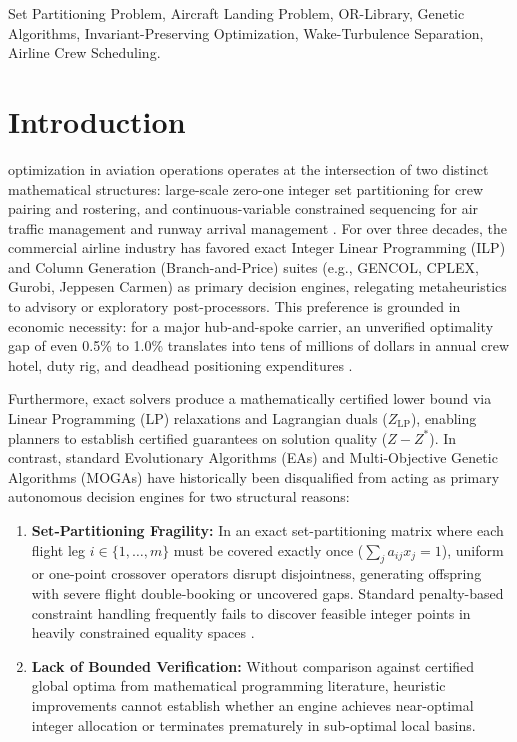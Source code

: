 \documentclass[10pt,journal,compsoc]{IEEEtran}
\begin{document}
{\begin{IEEEkeywords}
Set Partitioning Problem, Aircraft Landing Problem, OR-Library, Genetic Algorithms, Invariant-Preserving Optimization, Wake-Turbulence Separation, Airline Crew Scheduling.
\end{IEEEkeywords}}

\maketitle

\IEEEdisplaynontitleabstractindextext
\IEEEpeerreviewmaketitle

\section{Introduction}
 optimization in aviation operations operates at the intersection of two distinct mathematical structures: large-scale zero-one integer set partitioning for crew pairing and rostering, and continuous-variable constrained sequencing for air traffic management and runway arrival management \cite{barnhart2003airline}. For over three decades, the commercial airline industry has favored exact Integer Linear Programming (ILP) and Column Generation (Branch-and-Price) suites (e.g., GENCOL, CPLEX, Gurobi, Jeppesen Carmen) as primary decision engines, relegating metaheuristics to advisory or exploratory post-processors. This preference is grounded in economic necessity: for a major hub-and-spoke carrier, an unverified optimality gap of even 0.5\% to 1.0\% translates into tens of millions of dollars in annual crew hotel, duty rig, and deadhead positioning expenditures \cite{kasirzadeh2017}.

Furthermore, exact solvers produce a mathematically certified lower bound via Linear Programming (LP) relaxations and Lagrangian duals ($Z_{\text{LP}}$), enabling planners to establish certified guarantees on solution quality ($Z - Z^*$). In contrast, standard Evolutionary Algorithms (EAs) and Multi-Objective Genetic Algorithms (MOGAs) have historically been disqualified from acting as primary autonomous decision engines for two structural reasons:
\begin{enumerate}
    \item \textbf{Set-Partitioning Fragility:} In an exact set-partitioning matrix where each flight leg $i \in \{1, \dots, m\}$ must be covered exactly once ($\sum_j a_{ij} x_j = 1$), uniform or one-point crossover operators disrupt disjointness, generating offspring with severe flight double-booking or uncovered gaps. Standard penalty-based constraint handling frequently fails to discover feasible integer points in heavily constrained equality spaces \cite{chu1998constraint}.
    \item \textbf{Lack of Bounded Verification:} Without comparison against certified global optima from mathematical programming literature, heuristic improvements cannot establish whether an engine achieves near-optimal integer allocation or terminates prematurely in sub-optimal local basins.
\end{enumerate}
\end{document}
